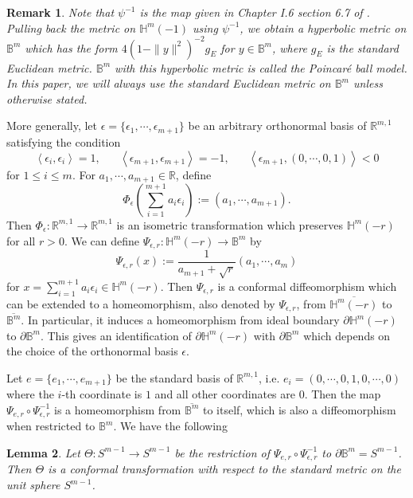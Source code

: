 \documentclass[12pt]{article}
\newtheorem{lem}{Lemma}[section]
\newtheorem{rmk}[lem]{Remark}
\begin{document}
\begin{rmk}
Note that $\psi^{-1}$ is the map given in Chapter I.6 section 6.7 of \cite{B.H}.
Pulling back the metric on ${\mathbb{H}^{m}(-1)}$ using $\psi^{-1}$, we obtain a hyperbolic
metric on ${\mathbb B^m}$ which has the form $4(1-\|y\|^2)^{-2} g_E$ for $y \in {\mathbb B^m}$, where $g_E$ is
the standard Euclidean metric.
${\mathbb B^m}$ with this hyperbolic metric is called the {\it Poincar\'{e} ball model}.
In this paper, we will always use the standard Euclidean metric on ${\mathbb B^m}$ unless otherwise stated.
\end{rmk}

More generally, let
$\epsilon = \{\epsilon_1,\cdots, \epsilon_{m+1}\}$ be an arbitrary
orthonormal basis of $\mathbb{R}^{m,1}$
satisfying the condition
\begin{equation} \label{eqn:condbasis}
\left<\epsilon_{i},\epsilon_{i}\right> = 1, \hspace{20pt}
\left<\epsilon_{m+1},\epsilon_{m+1}\right>=-1,  \hspace{20pt}
\left<\epsilon_{m+1},(0, \cdots, 0, 1) \right> < 0
\end{equation}
for $1 \leq i \leq m$.
For $a_1, \cdots, a_{m+1} \in \mathbb{R}$, define
\[ \Phi_\epsilon \left( \sum_{i=1}^{m+1} a_i \epsilon_i \right) := (a_1, \cdots, a_{m+1}). \]
Then $\Phi_\epsilon: \mathbb{R}^{m,1} \longrightarrow \mathbb{R}^{m,1}$
is an isometric transformation which preserves $\mathbb{H}^{m}(-r)$ for all $r > 0$.
We can define
 $\Psi_{\epsilon, r}: \mathbb{H}^{m}(-r) \longrightarrow \mathbb{B}^m $ by
 \begin{equation} \label{eqn:PsiEr}
 \Psi_{\epsilon, r} \left( x \right) := \frac{1}{a_{m+1} + \sqrt{r}} (a_1, \cdots, a_{m})
 \end{equation}
for $x=\sum_{i=1}^{m+1} a_i \epsilon_i \in \mathbb{H}^{m}(-r)$.
Then $\Psi_{\epsilon, r}$ is a conformal diffeomorphism which can be extended to a homeomorphism,
also denoted by $\Psi_{\epsilon, r}$,
from $\overline{\mathbb{H}^{m}(-r)}$ to $\overline{\mathbb{B}^m}$.
In particular, it induces a homeomorphism from ideal boundary $\partial {\mathbb{H}^{m}(-r)}$ to $\partial {\mathbb{B}^m}$.
This gives an identification of $\partial {\mathbb{H}^{m}(-r)}$ with $\partial {\mathbb{B}^m}$ which depends on
the choice of the orthonormal basis $\epsilon$.

Let $e = \{e_1, \cdots, e_{m+1}\}$ be the standard basis of $\mathbb{R}^{m,1}$, i.e.
$e_i = (0, \cdots, 0, 1, 0, \cdots, 0)$ where the $i$-th coordinate is $1$ and all other coordinates are $0$.
Then the map $\Psi_{e, r} \circ \Psi_{\epsilon, r}^{-1}$ is a homeomorphism from $\overline{\mathbb{B}^m}$ to itself, which is also a diffeomorphism when restricted to ${\mathbb{B}^m}$.
We have the following
\begin{lem} \label{lem:bdtrans}
Let $\Theta: S^{m-1} \longrightarrow S^{m-1}$ be the restriction of $\Psi_{e, r} \circ \Psi_{\epsilon, r}^{-1}$
to $\partial \mathbb{B}^m = S^{m-1}$. Then $\Theta$ is a conformal transformation with respect to the standard
metric on the unit sphere $S^{m-1}$.
\end{lem}
\end{document}

